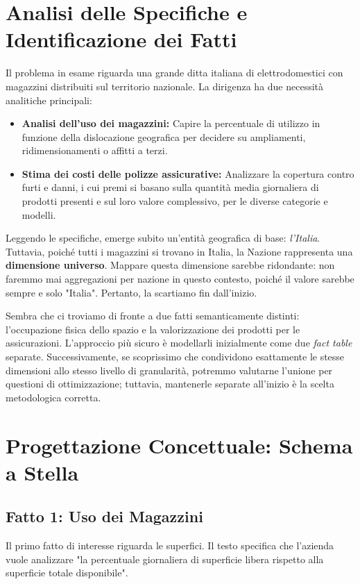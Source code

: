 \section{Analisi delle Specifiche e Identificazione dei Fatti}

Il problema in esame riguarda una grande ditta italiana di elettrodomestici con magazzini distribuiti sul territorio nazionale. La dirigenza ha due necessità analitiche principali:
\begin{itemize}
    \item \textbf{Analisi dell'uso dei magazzini:} Capire la percentuale di utilizzo in funzione della dislocazione geografica per decidere su ampliamenti, ridimensionamenti o affitti a terzi.
    \item \textbf{Stima dei costi delle polizze assicurative:} Analizzare la copertura contro furti e danni, i cui premi si basano sulla quantità media giornaliera di prodotti presenti e sul loro valore complessivo, per le diverse categorie e modelli.
\end{itemize}

Leggendo le specifiche, emerge subito un'entità geografica di base: \textit{l'Italia}. Tuttavia, poiché tutti i magazzini si trovano in Italia, la Nazione rappresenta una \textbf{dimensione universo}. Mappare questa dimensione sarebbe ridondante: non faremmo mai aggregazioni per nazione in questo contesto, poiché il valore sarebbe sempre e solo "Italia". Pertanto, la scartiamo fin dall'inizio.

Sembra che ci troviamo di fronte a due fatti semanticamente distinti: l'occupazione fisica dello spazio e la valorizzazione dei prodotti per le assicurazioni. L'approccio più sicuro è modellarli inizialmente come due \textit{fact table} separate. Successivamente, se scoprissimo che condividono esattamente le stesse dimensioni allo stesso livello di granularità, potremmo valutarne l'unione per questioni di ottimizzazione; tuttavia, mantenerle separate all'inizio è la scelta metodologica corretta.

\section{Progettazione Concettuale: Schema a Stella}

\subsection{Fatto 1: Uso dei Magazzini}

Il primo fatto di interesse riguarda le superfici. Il testo specifica che l'azienda vuole analizzare "la percentuale giornaliera di superficie libera rispetto alla superficie totale disponibile".


